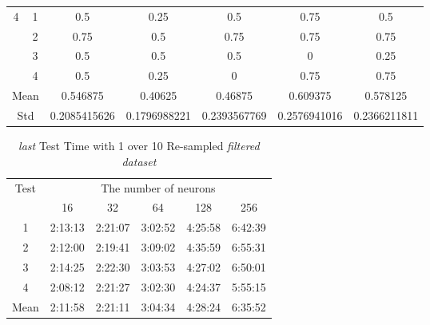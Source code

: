 \documentclass[draft,dvipsnames]{drexel-thesis}
\begin{document}
\begin{thesis}
\begin{table}[!t]
\begin{tabular}{|c|c|c|c|c|c|c|}
\multirow{4}{*}{4}    & 1                   & 0.5          & 0.25         & 0.5          & 0.75         & 0.5          \\ \cline{2-7}
                      & 2                   & 0.75         & 0.5          & 0.75         & 0.75         & 0.75         \\ \cline{2-7}
                      & 3                   & 0.5          & 0.5          & 0.5          & 0            & 0.25         \\ \cline{2-7}
                      & 4                   & 0.5          & 0.25         & 0            & 0.75         & 0.75         \\ \hline
\multicolumn{2}{|c|}{Mean}                  & 0.546875     & 0.40625      & 0.46875      & 0.609375     & 0.578125     \\ \hline
\multicolumn{2}{|c|}{Std}                   & 0.2085415626 & 0.1796988221 & 0.2393567769 & 0.2576941016 & 0.2366211811 \\ \hline
\end{tabular}
\end{table}

\begin{table}[!t]
\centering
\caption{{\em last} Test Time with 1 over 10 Re-sampled {\em filtered dataset}}
\label{tbl:last_1_10_time}
\begin{tabular}{|c|c|c|c|c|c|}
\hline
\multirow{2}{*}{Test}      & \multicolumn{5}{c|}{The number of neurons}                                                                                                               \\ \cline{2-6}
                           & 16                           & 32                           & 64                           & 128                          & 256                          \\ \hline
1                          & 2:13:13                      & 2:21:07                      & 3:02:52                      & 4:25:58                      & 6:42:39                      \\ \hline
2                          & 2:12:00                      & 2:19:41                      & 3:09:02                      & 4:35:59                      & 6:55:31                      \\ \hline
3                          & 2:14:25                      & 2:22:30                      & 3:03:53                      & 4:27:02                      & 6:50:01                      \\ \hline
4                          & 2:08:12                      & 2:21:27                      & 3:02:30                      & 4:24:37                      & 5:55:15                      \\ \hline
\multicolumn{1}{|l|}{Mean} & \multicolumn{1}{l|}{2:11:58} & \multicolumn{1}{l|}{2:21:11} & \multicolumn{1}{l|}{3:04:34} & \multicolumn{1}{l|}{4:28:24} & \multicolumn{1}{l|}{6:35:52} \\ \hline
\end{tabular}
\end{table}


\end{thesis}
\end{document}
